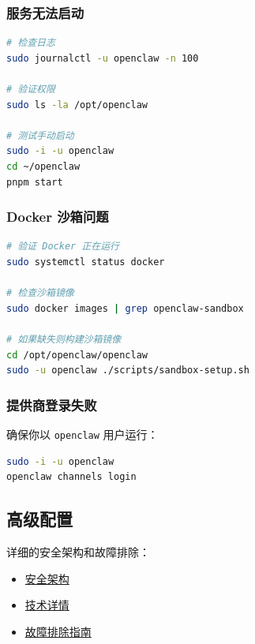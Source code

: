 \subsubsection{服务无法启动}


\begin{lstlisting}[language=bash]
# 检查日志
sudo journalctl -u openclaw -n 100

# 验证权限
sudo ls -la /opt/openclaw

# 测试手动启动
sudo -i -u openclaw
cd ~/openclaw
pnpm start
\end{lstlisting}


\subsubsection{Docker 沙箱问题}


\begin{lstlisting}[language=bash]
# 验证 Docker 正在运行
sudo systemctl status docker

# 检查沙箱镜像
sudo docker images | grep openclaw-sandbox

# 如果缺失则构建沙箱镜像
cd /opt/openclaw/openclaw
sudo -u openclaw ./scripts/sandbox-setup.sh
\end{lstlisting}


\subsubsection{提供商登录失败}


确保你以 \texttt{openclaw} 用户运行：

\begin{lstlisting}[language=bash]
sudo -i -u openclaw
openclaw channels login
\end{lstlisting}


\subsection{高级配置}


详细的安全架构和故障排除：

\begin{itemize}
  \item \href{https://github.com/openclaw/openclaw-ansible/blob/main/docs/security.md}{安全架构}
  \item \href{https://github.com/openclaw/openclaw-ansible/blob/main/docs/architecture.md}{技术详情}
  \item \href{https://github.com/openclaw/openclaw-ansible/blob/main/docs/troubleshooting.md}{故障排除指南}
\end{itemize}


